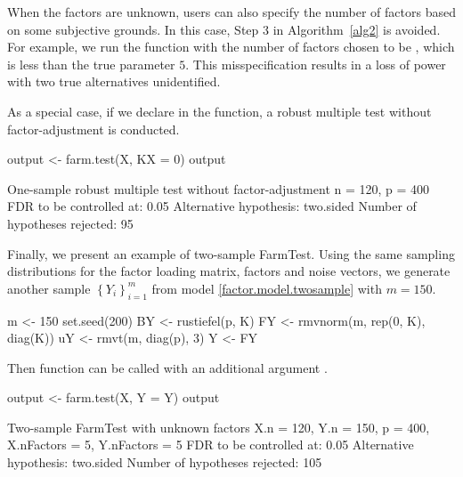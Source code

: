 
When the factors are unknown, users can also specify the number of factors based on some subjective grounds. In this case,  Step 3 in Algorithm~\ref{alg2} is avoided.
For example, we run the function with the number of factors chosen to be , which is less than the true parameter $5$. This misspecification results in a loss of power with two true alternatives unidentified.




As a special case, if we declare  in the function, a robust multiple test without factor-adjustment is conducted.


\begin{example*}
output <- farm.test(X, KX = 0)
output

One-sample robust multiple test without factor-adjustment
n = 120, p = 400
FDR to be controlled at: 0.05
Alternative hypothesis: two.sided
Number of hypotheses rejected: 95
\end{example*}




Finally, we present an example of two-sample FarmTest. Using the same sampling distributions for the factor loading matrix, factors and noise vectors, we generate another sample $\left\{Y_i\right\}_{i = 1}^{m}$ from model \eqref{factor.model.twosample} with $m = 150$.

\begin{example*}
m <- 150
set.seed(200)
BY <- rustiefel(p, K) %
FY <- rmvnorm(m, rep(0, K), diag(K))
uY <- rmvt(m, diag(p), 3)
Y <- FY %
\end{example*}

Then  function can be called with an additional argument .


\begin{example*}
output <- farm.test(X, Y = Y)
output

Two-sample FarmTest with unknown factors
X.n = 120, Y.n = 150, p = 400, X.nFactors = 5, Y.nFactors = 5
FDR to be controlled at: 0.05
Alternative hypothesis: two.sided
Number of hypotheses rejected: 105
\end{example*}



